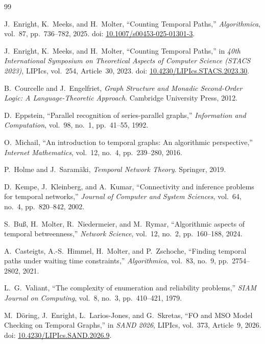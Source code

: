 \begin{thebibliography}{99}

J.~Enright, K.~Meeks, and H.~Molter,
``Counting Temporal Paths,''
\emph{Algorithmica}, vol.~87, pp.~736--782, 2025.
doi: \href{https://doi.org/10.1007/s00453-025-01301-3}{10.1007/s00453-025-01301-3}.

J.~Enright, K.~Meeks, and H.~Molter,
``Counting Temporal Paths,''
in \emph{40th International Symposium on Theoretical Aspects of Computer Science (STACS 2023)},
LIPIcs, vol.~254, Article~30, 2023.
doi: \href{https://doi.org/10.4230/LIPIcs.STACS.2023.30}{10.4230/LIPIcs.STACS.2023.30}.

B.~Courcelle and J.~Engelfriet,
\emph{Graph Structure and Monadic Second-Order Logic: A Language-Theoretic Approach}.
Cambridge University Press, 2012.

D.~Eppstein,
``Parallel recognition of series-parallel graphs,''
\emph{Information and Computation}, vol.~98, no.~1, pp.~41--55, 1992.

O.~Michail,
``An introduction to temporal graphs: An algorithmic perspective,''
\emph{Internet Mathematics}, vol.~12, no.~4, pp.~239--280, 2016.

P.~Holme and J.~Saramäki,
\emph{Temporal Network Theory}.
Springer, 2019.

D.~Kempe, J.~Kleinberg, and A.~Kumar,
``Connectivity and inference problems for temporal networks,''
\emph{Journal of Computer and System Sciences}, vol.~64, no.~4, pp.~820--842, 2002.

S.~Buß, H.~Molter, R.~Niedermeier, and M.~Rymar,
``Algorithmic aspects of temporal betweenness,''
\emph{Network Science}, vol.~12, no.~2, pp.~160--188, 2024.

A.~Casteigts, A.-S.~Himmel, H.~Molter, and P.~Zschoche,
``Finding temporal paths under waiting time constraints,''
\emph{Algorithmica}, vol.~83, no.~9, pp.~2754--2802, 2021.

L.~G.~Valiant,
``The complexity of enumeration and reliability problems,''
\emph{SIAM Journal on Computing}, vol.~8, no.~3, pp.~410--421, 1979.

M.~Döring, J.~Enright, L.~Larios-Jones, and G.~Skretas,
``FO and MSO Model Checking on Temporal Graphs,''
in \emph{SAND 2026}, LIPIcs, vol.~373, Article~9, 2026.
doi: \href{https://doi.org/10.4230/LIPIcs.SAND.2026.9}{10.4230/LIPIcs.SAND.2026.9}.


\end{thebibliography}
